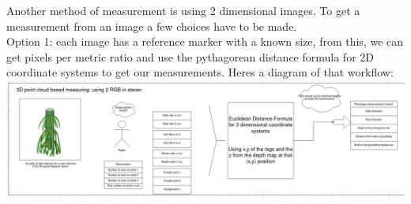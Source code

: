 \documentclass[11pt]{article}
\begin{document}
    Another method of measurement is using 2 dimensional images. To get a
measurement from an image a few choices have to be made.\\
Option 1: each image has a reference marker with a known size, from
this, we can get pixels per metric ratio and use the pythagorean
distance formula for 2D coordinate systems to get our measurements.
Heres a diagram of that workflow:
\includegraphics{the_matrix_files/image.png}
\end{document}
